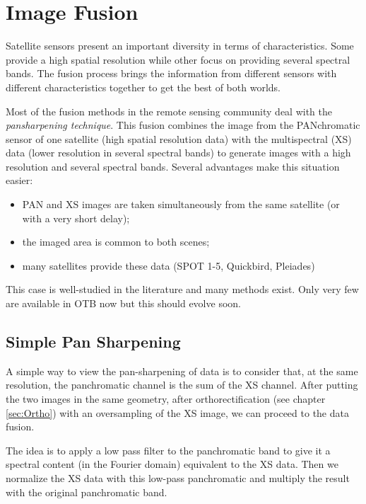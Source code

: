 
\chapter{Image Fusion }\label{sec:Fusion}

Satellite sensors present an important diversity in terms of characteristics.
Some provide a high spatial resolution while other focus on providing several
spectral bands. The fusion process brings the information from different
sensors with different characteristics together to get the best of both
worlds.

Most of the fusion methods in the remote sensing community deal with
the {\em pansharpening technique}. This fusion combines the image from
the PANchromatic sensor of one satellite (high spatial resolution
data) with the multispectral (XS) data (lower resolution in several
spectral bands) to generate images with a high resolution and several
spectral bands. Several advantages make this situation easier:

\begin{itemize}
\item PAN and XS images are taken simultaneously from the same satellite (or
with a very short delay);
\item the imaged area is common to both scenes;
\item many satellites provide these data (SPOT 1-5, Quickbird, Pleiades)
\end{itemize}

This case is well-studied in the literature and many methods exist. Only very
few are available in OTB now but this should evolve soon.


\section{Simple Pan Sharpening}\label{secPanSharpening}

A simple way to view the pan-sharpening of data is to consider that,
at the same resolution,  the panchromatic channel is the sum of the XS
channel. After putting the two images in the same geometry, after
orthorectification (see chapter \ref{sec:Ortho}) with an oversampling of the XS image, we can proceed to the data fusion. 

The idea is to apply a low pass filter to the panchromatic band to give it a spectral content (in the Fourier domain) equivalent to the XS data. Then we normalize the XS data with this low-pass panchromatic and multiply the result with the original panchromatic band.

